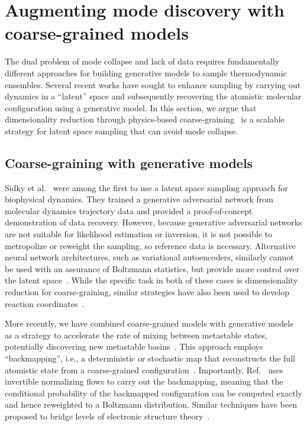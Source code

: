 \documentclass[11pt]{article}
\begin{document}
\section{Augmenting mode discovery with coarse-grained models}\label{sec:nfphys}


The dual problem of mode collapse and lack of data requires fundamentally different approaches for building generative models to sample thermodynamic ensembles.
Several recent works have sought to enhance sampling by carrying out dynamics in a ``latent'' space and subsequently recovering the atomistic molecular configuration using a generative model.
In this section, we argue that dimensionality reduction through physics-based coarse-graining~\cite{noid_multiscale_2008, jin_bottom-up_2022} is a scalable strategy for latent space sampling that can avoid mode collapse.

\subsection{Coarse-graining with generative models}

Sidky et al.~\cite{sidky_molecular_2020} were among the first to use a latent space sampling approach for biophysical dynamics.
They trained a generative adversarial network from molecular dynamics trajectory data and provided a proof-of-concept demonstration of data recovery.
However, because generative adversarial networks are not suitable for likelihood estimation or inversion, it is not possible to metropolize or reweight the sampling, so reference data is necessary.
Alternative neural network architectures, such as variational autoencoders, similarly cannot be used with an assurance of Boltzmann statistics, but provide more control over the latent space~\cite{wang_coarse-graining_2019}.
While the specific task in both of these cases is dimensionality reduction for coarse-graining, similar strategies have also been used to develop reaction coordinates~\cite{ribeiro_reweighted_2018}.

More recently, we have combined coarse-grained models with generative models as a strategy to accelerate the rate of mixing between metastable states, potentially discovering new metastable basins~\cite{chennakesavalu_ensuring_2023}.
This approach employs ``backmapping'', i.e., a deterministic or stochastic map that reconstructs the full atomistic state from a coarse-grained configuration~\cite{dunbrack_jr_bayesian_1997, bower_prediction_1997}.
Importantly, Ref.~\cite{chennakesavalu_adaptive_2023} uses invertible normalizing flows to carry out the backmapping, meaning that the conditional probability of the backmapped configuration can be computed exactly and hence reweighted to a Boltzmann distribution. 
Similar techniques have been proposed to bridge levels of electronic structure theory~\cite{maier_bypassing_2022}.
\end{document}
